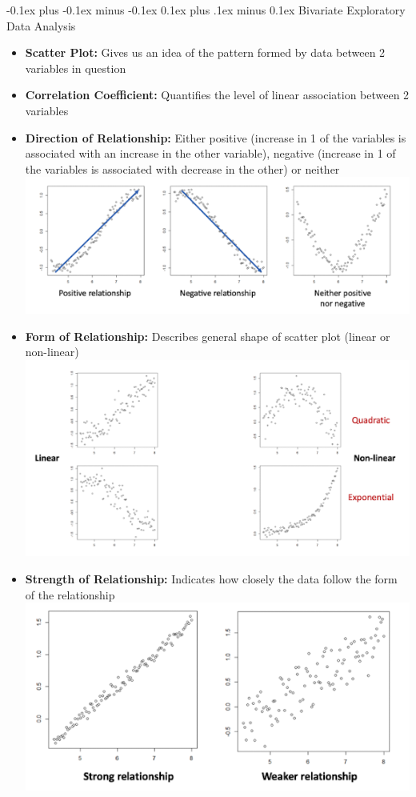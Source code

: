 \documentclass[landscape]{article}
\makeatletter
\renewcommand{\subsection}{\@startsection{subsection}{2}{0mm}%
  {-0.1ex plus -0.1ex minus -0.1ex}%
  {0.1ex plus .1ex minus 0.1ex}%
{\normalfont\scriptsize\bfseries}}
\makeatother
\begin{document}
\begin{multicols*}{5}
    \subsection{Bivariate Exploratory Data Analysis}
    \begin{itemize}
      \item \textbf{Scatter Plot:} Gives us an idea of the pattern formed by data between 2 variables in question
      \item \textbf{Correlation Coefficient:} Quantifies the level of linear association between 2 variables
      \item \textbf{Direction of Relationship:} Either positive (increase in 1 of the variables is associated with an increase in the other variable), negative (increase in 1 of the variables is associated with decrease in the other) or neither
      \includegraphics[width=0.9\linewidth]{4_direction.png}
      \item \textbf{Form of Relationship:} Describes general shape of scatter plot (linear or non-linear)
      \includegraphics[width=0.9\linewidth]{5_form.png}
      \item \textbf{Strength of Relationship:} Indicates how closely the data follow the form of the relationship
      \includegraphics[width=0.9\linewidth]{6_strength.png}
    \end{itemize}


\end{multicols*}
\end{document}
